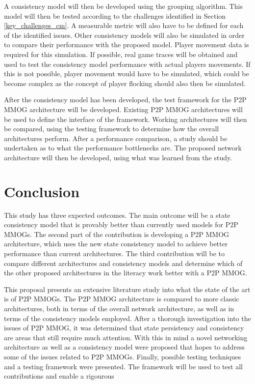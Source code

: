 \documentclass[journal,oneside,a4paper,onecolumn]{IEEEtran}
\begin{document}
A consistency model will then be developed using the grouping algorithm. This model will then be tested according to the challenges identified in Section \ref{key_challenges_cm}. A measurable metric will also have to be defined for each of the identified issues. Other consistency models will also be simulated in order to compare their performance with the proposed model. Player movement data is required for this simulation. If possible, real game traces will be obtained and used to test the consistency model performance with actual players movements. If this is not possible, player movement would have to be simulated, which could be become complex as the concept of player flocking should also then be simulated.

After the consistency model has been developed, the test framework for the P2P MMOG architecture will be developed. Existing P2P MMOG architectures will be used to define the interface of the framework. Working architectures will then be compared, using the testing framework to determine how the overall architectures perform. After a performance comparison, a study should be undertaken as to what the performance bottlenecks are. The proposed network architecture will then be developed, using what was learned from the study.


\section{Conclusion}

This study has three expected outcomes. The main outcome will be a state consistency model that is provably better than currently used models for P2P MMOGs. The second part of the contribution is developing a P2P MMOG architecture, which uses the new state consistency model to achieve better performance than current architectures. The third contribution will be to compare different architectures and consistency models and determine which of the other proposed architectures in the literacy work better with a P2P MMOG.

This proposal presents an extensive literature study into what the state of the art is of P2P MMOGs. The P2P MMOG architecture is compared to more classic architectures, both in terms of the overall network architecture, as well as in terms of the consistency models employed. After a thorough investigation into the issues of P2P MMOG, it was determined that state persistency and consistency are areas that still require much attention. With this in mind a novel networking architecture as well as a consistency model were proposed that hopes to address some of the issues related to P2P MMOGs. Finally, possible testing techniques and a testing framework were presented. The framework will be used to test all contributions and enable a rigourous  

\newpage



\end{document}
